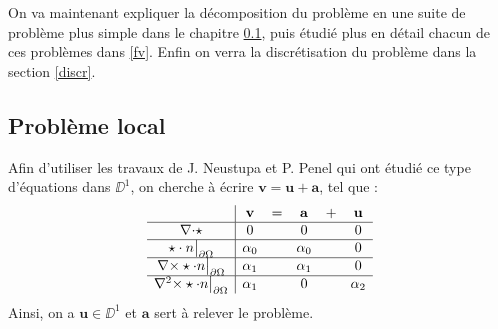 On va maintenant expliquer la décomposition du problème en une suite de problème plus simple dans le chapitre \ref{local}, puis étudié plus en détail chacun de ces problèmes dans \ref{fv}. Enfin on verra la discrétisation du problème dans la section \ref{discr}.

\subsection{Problème local}
\label{local}

Afin d'utiliser les travaux de J. Neustupa et P. Penel qui ont étudié ce type d'équations dans $\DD^1$, on cherche à écrire $\mathbf{v}=\mathbf{u}+\mathbf{a}$, tel que :\\
\begin{equation}
\label{v}
\begin{array}{c|ccccc}
& \mathbf{v} & = & \mathbf{a} & + & \mathbf{u}\\ \hline
{\nabla\cdot}\star & 0 & & 0 & & 0\\ \hline
\star\cdot n{\big\rvert_{\partial\Omega}} & \alpha_0 & & \alpha_0 & & 0\\ \hline
{\nabla\times}\star\cdot n{\big\rvert_{\partial\Omega}} & \alpha_1 & & \alpha_1 & & 0\\ \hline
{\nabla^2\times}\star\cdot n{\big\rvert_{\partial\Omega}} & \alpha_1 & & 0 & & \alpha_2
\end{array}
\end{equation}
Ainsi, on a $\mathbf{u}\in\DD^1$ et $\mathbf{a}$ sert à relever le problème.

